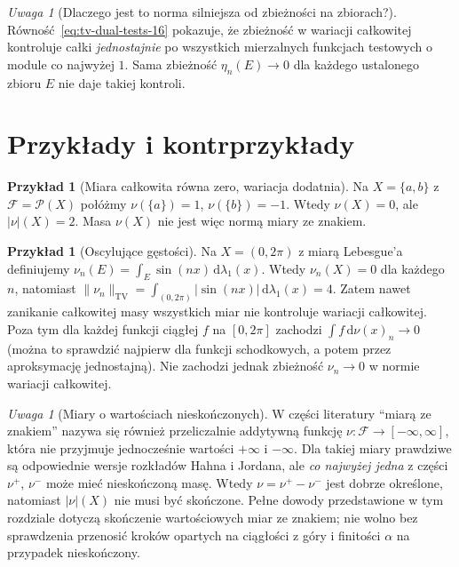 \documentclass[11pt,a4paper,oneside]{book}
\numberwithin{equation}{chapter}
\theoremstyle{plain}
\theoremstyle{definition}
\newtheorem{przyklad}[twierdzenie]{Przykład}
\theoremstyle{remark}
\newtheorem{uwaga}[twierdzenie]{Uwaga}
\begin{document}
\begin{uwaga}[Dlaczego jest to norma silniejsza od zbieżności na zbiorach?]
Równość~\eqref{eq:tv-dual-tests-16} pokazuje, że zbieżność
w wariacji całkowitej kontroluje całki \emph{jednostajnie}
po wszystkich mierzalnych funkcjach testowych o module
co najwyżej $1$. Sama zbieżność $\eta_n(E)\to0$ dla
każdego ustalonego zbioru $E$ nie daje takiej kontroli.
\end{uwaga}

\section{Przykłady i kontrprzykłady}
\begin{przyklad}[Miara całkowita równa zero, wariacja dodatnia]
Na $X=\{a,b\}$ z $\mathcal F=\mathcal P(X)$ połóżmy
$\nu(\{a\})=1$, $\nu(\{b\})=-1$. Wtedy
$\nu(X)=0$, ale $|\nu|(X)=2$.
Masa $\nu(X)$ nie jest więc normą miary ze znakiem.
\end{przyklad}

\begin{przyklad}[Oscylujące gęstości]
Na $X=(0,2\pi)$ z miarą Lebesgue'a definiujemy
$\nu_n(E)=\int_E\sin(nx)\,\mathrm d\lambda_1(x)$.
Wtedy $\nu_n(X)=0$ dla każdego $n$, natomiast
$\|\nu_n\|_{\mathrm{TV}}=
\int_{(0,2\pi)}|\sin(nx)|\,\mathrm d\lambda_1(x)=4$.
Zatem nawet zanikanie całkowitej masy wszystkich miar
nie kontroluje wariacji całkowitej. Poza tym dla każdej
funkcji ciągłej $f$ na $[0,2\pi]$ zachodzi
$\int f\,\mathrm d\nu(x)_n\to0$ (można to sprawdzić
najpierw dla funkcji schodkowych, a potem przez
aproksymację jednostajną). Nie zachodzi jednak
zbieżność $\nu_n\to0$ w normie wariacji całkowitej.
\end{przyklad}

\begin{uwaga}[Miary o wartościach nieskończonych]
W części literatury ``miarą ze znakiem'' nazywa się
również przeliczalnie addytywną funkcję
$\nu:\mathcal F\to[-\infty,\infty]$, która nie przyjmuje
jednocześnie wartości $+\infty$ i $-\infty$.
Dla takiej miary prawdziwe są odpowiednie wersje
rozkładów Hahna i Jordana, ale \emph{co najwyżej jedna}
z części $\nu^+$, $\nu^-$ może mieć nieskończoną masę.
Wtedy $\nu=\nu^+-\nu^-$ jest dobrze określone,
natomiast $|\nu|(X)$ nie musi być skończone.
Pełne dowody przedstawione w tym rozdziale dotyczą
skończenie wartościowych miar ze znakiem; nie wolno
bez sprawdzenia przenosić kroków opartych na
ciągłości z góry i finitości $\alpha$ na przypadek
nieskończony.
\end{uwaga}
\end{document}
